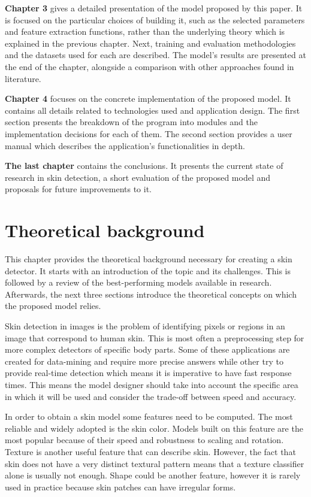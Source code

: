 \documentclass[12pt]{report}
\begin{document}
	\textbf{Chapter 3} gives a detailed presentation of the model proposed by this paper. It is focused on the particular choices of building it, such as the selected parameters and feature extraction functions, rather than the underlying theory which is explained in the previous chapter. Next, training and evaluation methodologies and the datasets used for each are described. The model's results are presented at the end of the chapter, alongside a comparison with other approaches found in literature.
	
	\textbf{Chapter 4} focuses on the concrete implementation of the proposed model. It contains all details related to technologies used and application design. The first section presents the breakdown of the program into modules and the implementation decisions for each of them. The second section provides a user manual which describes the application's functionalities in depth.
	
	\textbf{The last chapter} contains the conclusions. It presents the current state of research in skin detection, a short evaluation of the proposed model and proposals for future improvements to it.
	
	\chapter{Theoretical background}
	This chapter provides the theoretical background necessary for creating a skin detector. It starts with an introduction of the topic and its challenges. This is followed by a review of the best-performing models available in research. Afterwards, the next three sections introduce the theoretical concepts on which the proposed model relies.
	
	Skin detection in images is the problem of identifying pixels or regions in an image that correspond to human skin. This is most often a preprocessing step for more complex detectors of specific body parts. Some of these applications are created for data-mining and require more precise answers while other try to provide real-time detection which means it is imperative to have fast response times. This means the model designer should take into account the specific area in which it will be used and consider the trade-off between speed and accuracy.
	
	In order to obtain a skin model some features need to be computed. The most reliable and widely adopted is the skin color. Models built on this feature are the most popular because of their speed and robustness to scaling and rotation\cite{survey_skin_color_modeling}. Texture is another useful feature that can describe skin. However, the fact that skin does not have a very distinct textural pattern means that a texture classifier alone is usually not enough. Shape could be another feature, however it is rarely used in practice because skin patches can have irregular forms.
	
\end{document}
